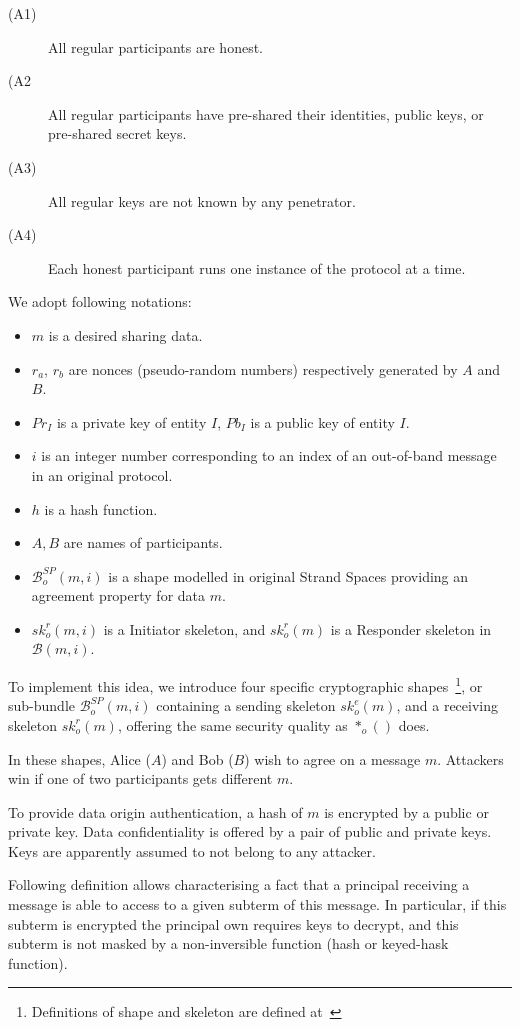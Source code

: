 \begin{description}
\item [(A1)] All regular participants are honest. 
\item [(A2] All regular participants have pre-shared their identities, public keys, or pre-shared secret keys. 
\item [(A3)] All regular keys are not known by any penetrator. 
\item [(A4)] Each honest participant runs one instance of the protocol at a time. 
\end{description}

We adopt following notations: 
\begin{itemize}
\item $m$ is a desired sharing data. 
\item $r_a$, $r_b$ are nonces (pseudo-random numbers) respectively generated by $A$ and $B$. 
\item $Pr_I$ is a private key of entity $I$, $Pb_I$ is a public key of entity $I$. 
\item $i$ is an integer number corresponding to an index of an out-of-band message in an original protocol. 
\item $h$ is a hash function. 
\item $A,B$ are names of participants. 
\item $\mathcal{B}^{SP}_o(m,i)$ is a shape modelled in original Strand Spaces providing an agreement property for data $m$. 
\item $sk^r_o(m,i)$ is a Initiator skeleton, and $sk^r_o(m)$ is a Responder skeleton in $\mathcal{B}(m,i)$. 
\end{itemize}

To implement this idea, we introduce four specific cryptographic shapes~\footnote{Definitions of shape and skeleton are defined at~\cite{Doghmi:2007:SHS:1230146.1230260}}, or sub-bundle $\mathcal{B}^{SP}_{o}(m,i)$ containing a sending skeleton $sk^e_o(m)$, and a receiving skeleton $sk^r_o(m)$, offering the same security quality as $*_o()$ does.

In these shapes, Alice ($A$) and Bob ($B$) wish to agree on a message $m$. Attackers win if one of two participants gets different $m$. 

To provide data origin authentication, a hash of $m$ is encrypted by a public or private key. Data confidentiality is offered by a pair of public and private keys. Keys are apparently assumed to not belong to any attacker. 

Following definition allows characterising a fact that a principal receiving a message is able to access to a given subterm of this message. In particular, if this subterm is encrypted the principal own requires keys to decrypt, and this subterm is not masked by a non-inversible function (hash or keyed-hask function). 

